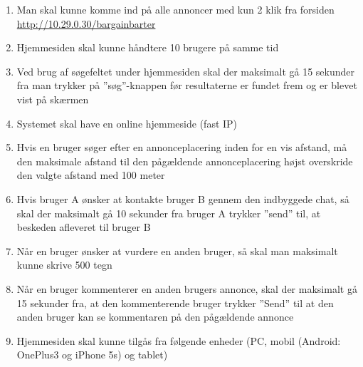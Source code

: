 \begin{enumerate}
	\item Man skal kunne komme ind på alle annoncer med kun 2 klik fra forsiden \url{http://10.29.0.30/bargainbarter}
	
	\item Hjemmesiden skal kunne håndtere 10 brugere på samme tid
	
	\item Ved brug af søgefeltet under hjemmesiden skal der maksimalt gå 15 sekunder fra man trykker på ''søg''-knappen før resultaterne er fundet frem og er blevet vist på skærmen
	
	\item Systemet skal have en online hjemmeside (fast IP)
	
	\item Hvis en bruger søger efter en annonceplacering inden for en vis afstand, må den maksimale afstand til den pågældende annonceplacering højst overskride den valgte afstand med 100 meter
	
	\item Hvis bruger A ønsker at kontakte bruger B gennem den indbyggede chat, så skal der maksimalt  gå 10 sekunder fra bruger A trykker ''send'' til, at beskeden afleveret til bruger B
	
	\item Når en bruger ønsker at vurdere en anden bruger, så skal man maksimalt kunne skrive 500 tegn
	
	\item Når en bruger kommenterer en anden brugers annonce, skal der maksimalt gå 15 sekunder fra, at den kommenterende bruger trykker ''Send'' til at den anden bruger kan se kommentaren på den pågældende annonce
	
	\item Hjemmesiden skal kunne tilgås fra følgende enheder (PC, mobil (Android: OnePlus3 og iPhone 5s) og tablet)
	
	
\end{enumerate}